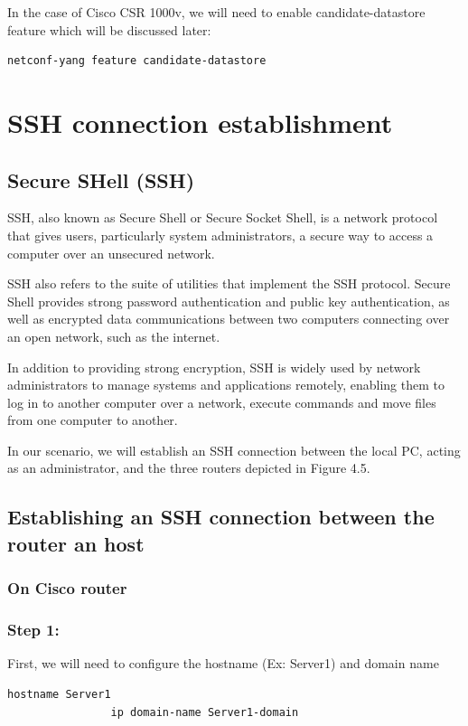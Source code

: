 In the case of Cisco CSR 1000v, we will need to enable candidate-datastore feature which will be discussed later:


\begin{lstlisting}[style=cliStyle,  backgroundcolor=\color{codebackground}]
                netconf-yang feature candidate-datastore
\end{lstlisting}
\section{SSH connection establishment}
\subsection{Secure SHell (SSH)}
SSH, also known as Secure Shell or Secure Socket Shell, is a network protocol that gives users, particularly system administrators, a secure way to access a computer over an unsecured network.

SSH also refers to the suite of utilities that implement the SSH protocol. Secure Shell provides strong password authentication and public key authentication, as well as encrypted data communications between two computers connecting over an open network, such as the internet.

In addition to providing strong encryption, SSH is widely used by network administrators to manage systems and applications remotely, enabling them to log in to another computer over a network, execute commands and move files from one computer to another.

In our scenario, we will establish an SSH connection between the local PC, acting as an administrator, and the three routers depicted in Figure 4.5.

\subsection{Establishing an SSH connection between the router an host}
\subsubsection{On Cisco router}
\subsubsection{Step 1:}
First, we will need to configure the hostname (Ex: Server1) and domain name 
\begin{lstlisting}[style=cliStyle,  backgroundcolor=\color{codebackground}]
                hostname Server1
                ip domain-name Server1-domain
\end{lstlisting}
